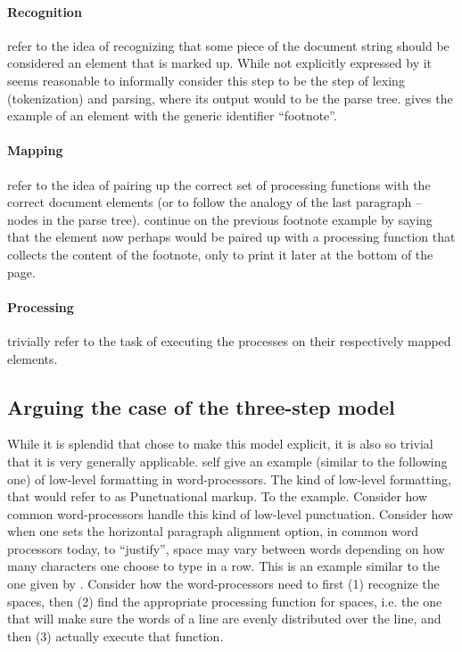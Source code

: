 \documentclass{scrreprt}
\begin{document}
\paragraph{Recognition} refer to the idea of recognizing that some piece of the document string should be considered an element that is marked up. While not explicitly expressed by \citet{goldfarb} it seems reasonable to informally consider this step to be the step of lexing (tokenization) and parsing, where its output would to be the parse tree. \citet{goldfarb} gives the example of an element with the generic identifier ``footnote''.

\paragraph{Mapping} refer to the idea of pairing up the correct set of processing functions with the correct document elements (or to follow the analogy of the last paragraph -- nodes in the parse tree). \citet{goldfarb} continue on the previous footnote example by saying that the element now perhaps would be paired up with a processing function that collects the content of the footnote, only to print it later at the bottom of the page.

\paragraph{Processing} trivially refer to the task of executing the processes on their respectively mapped elements.


\subsection{Arguing the case of the three-step model}
While it is splendid that \citet{goldfarb} chose to make this model explicit, it is also so trivial that it is very generally applicable. \citet{goldfarb} self give an example (similar to the following one) of low-level formatting in word-processors. The kind of low-level formatting, that \citet{coombs} would refer to as Punctuational markup. To the example. Consider how common word-processors handle this kind of low-level punctuation. Consider how when one sets the horizontal paragraph alignment option, in common word processors today, to ``justify'', space may vary between words depending on how many characters one choose to type in a row. This is an example similar to the one given by \citet{goldfarb}. Consider how the word-processors need to first (1) recognize the spaces, then (2) find the appropriate processing function for spaces, i.e. the one that will make sure the words of a line are evenly distributed over the line, and then (3) actually execute that function.
\end{document}
